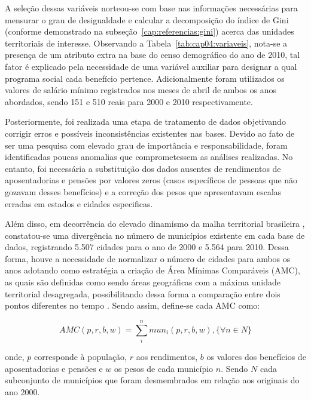 A seleção dessas variáveis norteou-se com base nas informações necessárias para mensurar o grau de desigualdade e calcular a decomposição do índice de Gini (conforme demonstrado na subseção~\ref{cap:referencias:gini}) acerca das unidades territoriais de interesse.  Observando a Tabela~\ref{tab:cap04:variaveis}, nota-se a presença de um atributo extra na base do censo demográfico do ano de 2010, tal fator é explicado pela necessidade de uma variável auxiliar para designar a qual programa social cada benefício pertence. Adicionalmente foram utilizados os valores de salário mínimo registrados nos meses de abril de ambos os anos abordados, sendo 151 e 510 reais para 2000 e 2010 respectivamente.

Posteriormente, foi realizada uma etapa de tratamento de dados objetivando corrigir erros e possíveis inconsistências existentes nas bases. Devido ao fato de ser uma pesquisa com elevado grau de importância e responsabilidade, foram identificadas poucas anomalias que comprometessem as análises realizadas. No entanto, foi necessária a substituição dos dados ausentes de rendimentos de aposentadorias e pensões por valores zeros (casos específicos de pessoas que não gozavam desses benefícios) e a correção dos pesos que apresentavam escalas erradas em estados e cidades especificas. 

Além disso, em decorrência do elevado dinamismo da malha territorial brasileira \cite{cap04_ref17}, constatou-se uma divergência no número de municípios existente em cada base de dados, registrando 5.507 cidades para o ano de 2000 e 5.564 para 2010. Dessa forma, houve a necessidade de normalizar o número de cidades para ambos os anos adotando como estratégia a criação de Área Mínimas Comparáveis (AMC), as quais são definidas como sendo áreas geográficas com a máxima unidade territorial desagregada, possibilitando dessa forma a comparação entre dois pontos diferentes no tempo \cite{cap04_ref15, cap04_ref16}. Sendo assim, define-se cada AMC como:

\begin{equation}
    AMC(p, r, b, w) = \sum_{i}^{n} mun_{i}(p, r, b, w), \{\forall n \in N\}
\end{equation}

\noindent onde, $p$ corresponde à população, $r$ aos rendimentos, $b$ os valores dos benefícios de aposentadorias e pensões e $w$ os pesos de cada município $n$. Sendo $N$ cada subconjunto de municípios que foram desmembrados em relação aos originais do ano 2000.


